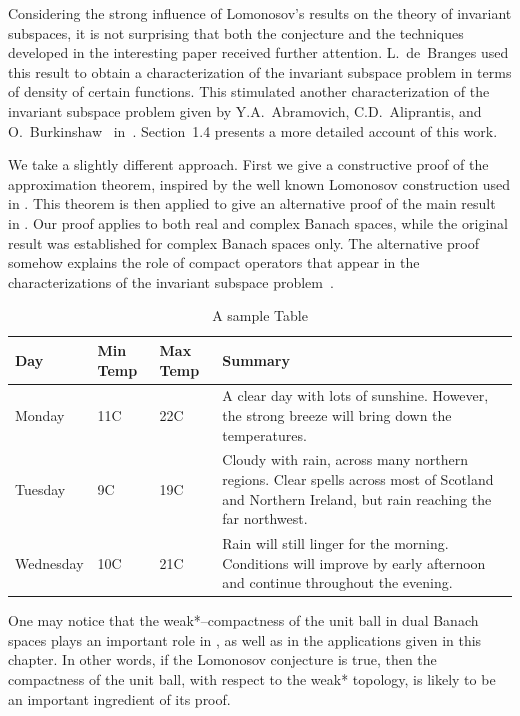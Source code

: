 \bigskip
\goodbreak

Considering the strong influence of Lomonosov's results on the
theory of invariant subspaces, it is not surprising that both
the conjecture and the techniques developed in the interesting
paper \citep{Lom91} received further attention. L.~de~Branges
used this result to obtain a characterization of the invariant
subspace problem in terms of density of certain functions. This
stimulated another characterization of the invariant subspace
problem given by Y.A.~Abramovich, C.D.~Aliprantis, and
O.~Burkinshaw ~in~\citep{AAB95}. Section~1.4 presents a more
detailed account of this work.

We take a slightly different approach. First we give a
constructive proof of the approximation theorem, inspired by
the well known Lomonosov construction used in
\citep{Lom73,RR73}. This theorem is then applied to give an
alternative proof of the main result in \citep{AAB95}. Our proof
applies to both real and complex Banach spaces, while the
original result was established for complex Banach spaces only.
The alternative proof somehow explains the role of compact
operators that appear in the characterizations of the invariant
subspace problem~\citep{AAB95}.

\medskip

\begin{table}
\caption{A sample Table}
\begin{center}
    \begin{tabular}{ | l | l | l | p{5cm} |}
    \hline
    Day & Min Temp & Max Temp & Summary \\ \hline
    Monday & 11C & 22C & A clear day with lots of sunshine.  
    However, the strong breeze will bring down the temperatures. \\ \hline
    Tuesday & 9C & 19C & Cloudy with rain, across many northern regions. Clear spells
    across most of Scotland and Northern Ireland,
    but rain reaching the far northwest. \\ \hline
    Wednesday & 10C & 21C & Rain will still linger for the morning.
    Conditions will improve by early afternoon and continue
    throughout the evening. \\
    \hline
    \end{tabular}
\end{center}
\label{tbl1}
\end{table}

One may notice that the weak*--compactness of the unit ball in
dual Banach spaces plays an important role in
\citep{AAB95,dB59,dB93,Lom91}, as well as in the applications
given in this chapter. In other words, if the Lomonosov
conjecture is true, then the compactness of the unit ball, with
respect to the weak* topology, is likely to be an important
ingredient of its proof.

